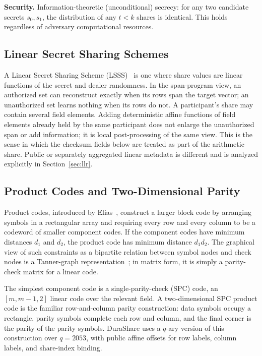 \documentclass[11pt]{article}
\begin{document}
\textbf{Security.} Information-theoretic (unconditional) secrecy: for any two candidate secrets $s_0, s_1$, the distribution of any $t < k$ shares is identical. This holds regardless of adversary computational resources.

\subsection{Linear Secret Sharing Schemes}

A Linear Secret Sharing Scheme (LSSS)~\cite{beimel2011} is one where share values are linear functions of the secret and dealer randomness. In the span-program view, an authorized set can reconstruct exactly when its rows span the target vector; an unauthorized set learns nothing when its rows do not. A participant's share may contain several field elements. Adding deterministic affine functions of field elements already held by the same participant does not enlarge the unauthorized span or add information; it is local post-processing of the same view. This is the sense in which the checksum fields below are treated as part of the arithmetic share. Public or separately aggregated linear metadata is different and is analyzed explicitly in Section~\ref{sec:llr}.

\subsection{Product Codes and Two-Dimensional Parity}

Product codes, introduced by Elias~\cite{elias1954}, construct a larger block code by arranging symbols in a rectangular array and requiring every row and every column to be a codeword of smaller component codes. If the component codes have minimum distances $d_1$ and $d_2$, the product code has minimum distance $d_1 d_2$. The graphical view of such constraints as a bipartite relation between symbol nodes and check nodes is a Tanner-graph representation~\cite{tanner1981}; in matrix form, it is simply a parity-check matrix for a linear code.

The simplest component code is a single-parity-check (SPC) code, an $[m,m{-}1,2]$ linear code over the relevant field. A two-dimensional SPC product code is the familiar row-and-column parity construction: data symbols occupy a rectangle, parity symbols complete each row and column, and the final corner is the parity of the parity symbols. DuraShare uses a $q$-ary version of this construction over $q=2053$, with public affine offsets for row labels, column labels, and share-index binding.
\end{document}
